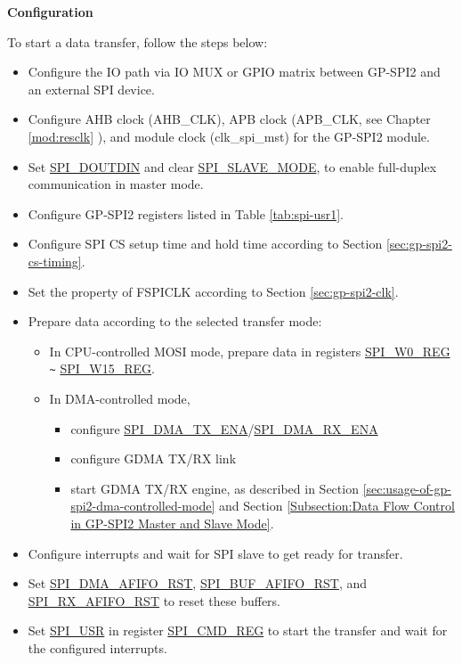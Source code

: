\documentclass[main\_\_EN.tex]{subfiles}
\begin{document}
\textbf{Configuration}

To start a data transfer, follow the steps below:
\begin{itemize}
    \item Configure the IO path via IO MUX or GPIO matrix between GP-SPI2 and an external SPI device.
    \item Configure AHB clock (AHB\_CLK), APB clock (APB\_CLK, see Chapter \ref{mod:resclk} \textit{}), and module clock (clk\_spi\_mst) for the GP-SPI2 module.
    \item Set \hyperref[fielddesc:SPIDOUTDIN]{SPI\_DOUTDIN} and clear \hyperref[fielddesc:SPISLAVEMODE]{SPI\_SLAVE\_MODE}, to enable full-duplex communication in master mode.

    \item Configure GP-SPI2 registers listed in Table \ref{tab:spi-usr1}.

    \item Configure SPI CS setup time and hold time according to Section \ref{sec:gp-spi2-cs-timing}.

    \item Set the property of FSPICLK according to Section \ref{sec:gp-spi2-clk}.

    \item Prepare data according to the selected transfer mode:
    \begin{itemize}
        \item In CPU-controlled MOSI mode, prepare data in registers \hyperref[regdesc:SPIW0REG]{SPI\_W0\_REG} \verb+~+ \hyperref[regdesc:SPIW15REG]{SPI\_W15\_REG}.

        \item In DMA-controlled mode,
        \begin{itemize}
            \item configure \hyperref[fielddesc:SPIDMATXENA]{SPI\_DMA\_TX\_ENA}/\hyperref[fielddesc:SPIDMARXENA]{SPI\_DMA\_RX\_ENA}
            \item configure GDMA TX/RX link
            \item start GDMA TX/RX engine, as described in Section \ref{sec:usage-of-gp-spi2-dma-controlled-mode} and Section \ref{Subsection:Data Flow Control in GP-SPI2 Master and Slave Mode}.
        \end{itemize}
    \end{itemize}

    \item Configure interrupts \label{step:master-interrupt-fd} and wait for SPI slave to get ready for transfer.

    \item Set \hyperref[fielddesc:SPIDMAAFIFORST]{SPI\_DMA\_AFIFO\_RST}, \hyperref[fielddesc:SPIBUFAFIFORST]{SPI\_BUF\_AFIFO\_RST}, and \hyperref[fielddesc:SPIRXAFIFORST]{SPI\_RX\_AFIFO\_RST} to reset these buffers.

    \item Set \hyperref[fielddesc:SPIUSR]{SPI\_USR} in register \hyperref[regdesc:SPICMDREG]{SPI\_CMD\_REG} to start the transfer and wait for the configured interrupts.

\end{itemize}
\end{document}
